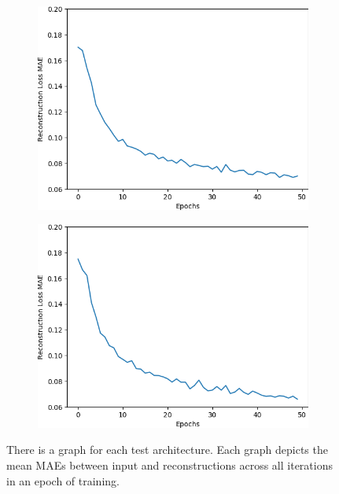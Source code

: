 \begin{figure}[H]
    \begin{subfigure}{.25\textwidth}
        \centering
        \includegraphics[width=\textwidth]
        {images/figures/experiments_architecture/mae_graphKernel3adjusted8x8x64_dim1024.png}
        \caption{}
    \end{subfigure}%
    \begin{subfigure}{.25\textwidth}
        \centering
        \includegraphics[width=\textwidth]
        {images/figures/experiments_architecture/mae_graphKernel3adjusted16x16x32_dim1024.png}
        \caption{}
    \end{subfigure}
    \caption{There is a graph for each test architecture.
    Each graph depicts the mean MAEs between input and reconstructions across all iterations in an epoch of training.} 
    \label{figure_learning_curves_1}
\end{figure} 

